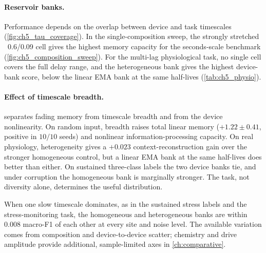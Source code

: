 \documentclass[12pt, twoside]{report}
\begin{document}
\paragraph{Reservoir banks.} Performance depends on the overlap between device and task timescales (\cref{fig:ch5_tau_coverage}). In the single-composition sweep, the strongly stretched \PEO{}~0.6/0.09 cell gives the highest memory capacity for the seconds-scale benchmark (\cref{fig:ch5_composition_sweep}). For the multi-lag physiological task, no single cell covers the full delay range, and the heterogeneous bank gives the highest device-bank score, below the linear EMA bank at the same half-lives (\cref{tab:ch5_physio}).

\paragraph{Effect of timescale breadth.}  separates fading memory from timescale breadth and from the device nonlinearity. On random input, breadth raises total linear memory ($+1.22\pm0.41$, positive in $10/10$ seeds) and nonlinear information-processing capacity. On real physiology, heterogeneity gives a $+0.023$ context-reconstruction gain over the stronger homogeneous control, but a linear EMA bank at the same half-lives does better than either. On sustained three-class labels the two device banks tie, and under corruption the homogeneous bank is marginally stronger. The task, not diversity alone, determines the useful distribution.

When one slow timescale dominates, as in the sustained stress labels and the stress-monitoring task, the homogeneous and heterogeneous banks are within $0.008$ macro-F1 of each other at every site and noise level. The available variation comes from composition and device-to-device scatter; chemistry and drive amplitude provide additional, sample-limited axes in \cref{ch:comparative}.
\end{document}
